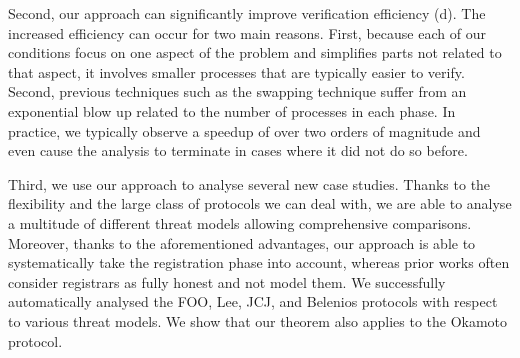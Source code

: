   
Second, our approach can significantly improve verification efficiency (d).
  The increased efficiency can occur for two main reasons.
  First, because each of our conditions focus on one aspect of the problem and simplifies parts 
  not related to that aspect, it involves smaller processes that are
  typically easier to verify.
  Second, previous techniques such as the swapping technique suffer from an exponential blow up
  related to the number of processes in each phase.
  In practice, we typically observe a speedup of over two orders of magnitude
  and even cause the analysis to terminate in cases where it did not do
  so before.
  

  Third, we use our approach to analyse several new case studies.
  Thanks to the flexibility and the large class of protocols we can deal with,
  we are able to analyse a multitude of different threat models allowing comprehensive
  comparisons.
  Moreover, thanks to the aforementioned advantages,
  our approach is able to systematically take the registration phase
  into account, whereas prior works often consider registrars as fully honest and not
  model them.
  We successfully automatically analysed the FOO, Lee, JCJ, and Belenios
  protocols with respect to various threat models.
  We show that our theorem also applies to the Okamoto protocol.

